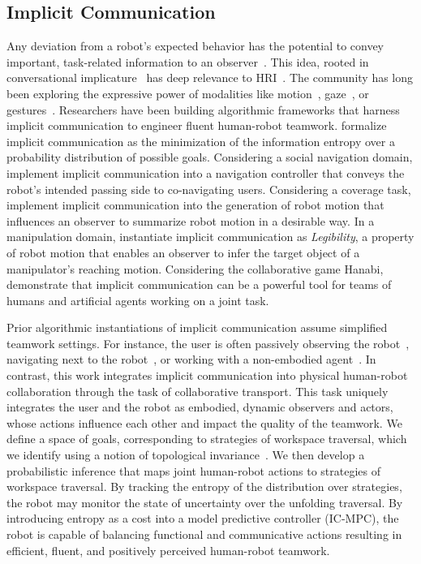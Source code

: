 \subsection{Implicit Communication}

Any deviation from a robot's expected behavior has the potential to convey important, task-related information to an observer~\citep{knepper2017implicit}. This idea, rooted in conversational implicature~\citep{grice1975logic} has deep relevance to HRI~\citep{urakami2023nonverbal,hoffman2024inferring,venture2019expressive}. The community has long been exploring the expressive power of modalities like motion~\citep{takayama2011expressing}, gaze~\citep{admoni2014deliberate}, or gestures~\citep{carter2014catch}. Researchers have been building algorithmic frameworks that harness implicit communication to engineer fluent human-robot teamwork. \citet{knepper2017implicit} formalize implicit communication as the minimization of the information entropy over a probability distribution of possible goals. Considering a social navigation domain, \citet{mavrogiannis2022socialmomentum} implement implicit communication into a navigation controller that conveys the robot's intended passing side to co-navigating users. Considering a coverage task, \citet{walker2021influencing} implement implicit communication into the generation of robot motion that influences an observer to summarize robot motion in a desirable way. In a manipulation domain, \citet{DraganAuR14} instantiate implicit communication as \emph{Legibility}, a property of robot motion that enables an observer to infer the target object of a manipulator's reaching motion. Considering the collaborative game Hanabi, \citet{liang2019implicit} demonstrate that implicit communication can be a powerful tool for teams of humans and artificial agents working on a joint task.

Prior algorithmic instantiations of implicit communication assume simplified teamwork settings. For instance, the user is often passively observing the robot~\citep{DraganAuR14,walker2021influencing}, navigating next to the robot~\citep{mavrogiannis2022socialmomentum}, or working with a non-embodied agent~\citep{liang2019implicit}. In contrast, this work integrates implicit communication into physical human-robot collaboration through the task of collaborative transport. This task uniquely integrates the user and the robot as embodied, dynamic observers and actors, whose actions influence each other and impact the quality of the teamwork. We define a space of goals, corresponding to strategies of workspace traversal, which we identify using a notion of topological invariance~\citep{mavrogiannis2023winding}. We then develop a probabilistic inference that maps joint human-robot actions to strategies of workspace traversal. By tracking the entropy of the distribution over strategies, the robot may monitor the state of uncertainty over the unfolding traversal. By introducing entropy as a cost into a model predictive controller (IC-MPC), the robot is capable of balancing functional and communicative actions resulting in efficient, fluent, and positively perceived human-robot teamwork.
